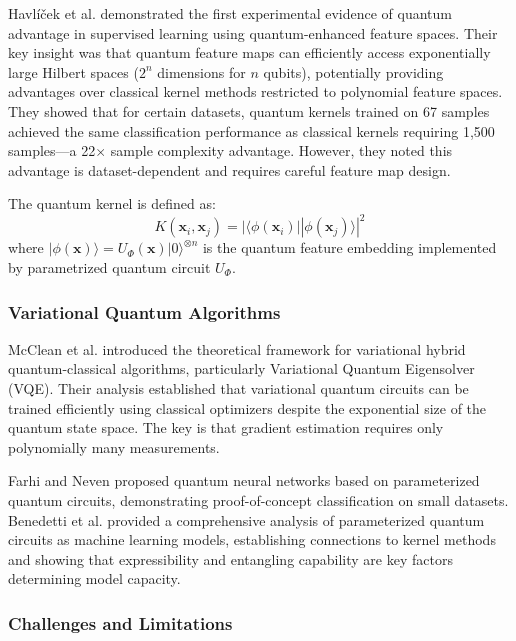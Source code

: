 \documentclass[11pt,letterpaper]{article}
\newcommand{\ket}[1]{|#1\rangle}
\newcommand{\bra}[1]{\langle#1|}
\begin{document}
Havlíček et al. \cite{havlicek2019supervised} demonstrated the first experimental evidence of quantum advantage in supervised learning using quantum-enhanced feature spaces. Their key insight was that quantum feature maps can efficiently access exponentially large Hilbert spaces ($2^n$ dimensions for $n$ qubits), potentially providing advantages over classical kernel methods restricted to polynomial feature spaces. They showed that for certain datasets, quantum kernels trained on 67 samples achieved the same classification performance as classical kernels requiring 1,500 samples---a 22$\times$ sample complexity advantage. However, they noted this advantage is dataset-dependent and requires careful feature map design.

The quantum kernel is defined as:
\begin{equation}
K(\mathbf{x}_i, \mathbf{x}_j) = |\bra{\phi(\mathbf{x}_i)}\ket{\phi(\mathbf{x}_j)}|^2
\end{equation}
where $\ket{\phi(\mathbf{x})} = U_{\Phi}(\mathbf{x})\ket{0}^{\otimes n}$ is the quantum feature embedding implemented by parametrized quantum circuit $U_{\Phi}$.

\subsubsection{Variational Quantum Algorithms}

McClean et al. \cite{mcclean2016theory} introduced the theoretical framework for variational hybrid quantum-classical algorithms, particularly Variational Quantum Eigensolver (VQE). Their analysis established that variational quantum circuits can be trained efficiently using classical optimizers despite the exponential size of the quantum state space. The key is that gradient estimation requires only polynomially many measurements.

Farhi and Neven \cite{farhi2018classification} proposed quantum neural networks based on parameterized quantum circuits, demonstrating proof-of-concept classification on small datasets. Benedetti et al. \cite{benedetti2019parameterized} provided a comprehensive analysis of parameterized quantum circuits as machine learning models, establishing connections to kernel methods and showing that expressibility and entangling capability are key factors determining model capacity.

\subsubsection{Challenges and Limitations}
\end{document}
